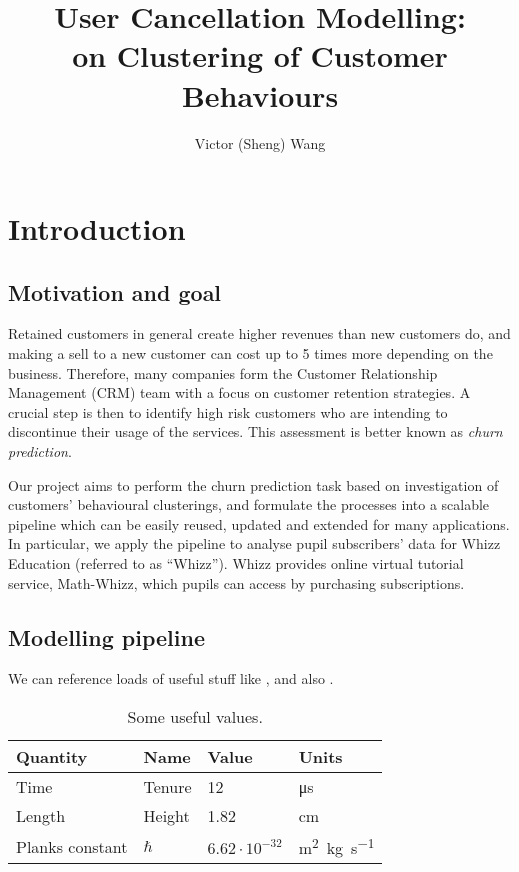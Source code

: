 \documentclass[english,a4,oneside,9pt]{extarticle}
\title{User Cancellation Modelling:
\\on Clustering of Customer Behaviours}
\author{Victor (Sheng) Wang}
\begin{document}




\section{Introduction}
\subsection*{Motivation and goal}

Retained customers in general create higher revenues than new customers do, and
making a sell to a new customer can cost up to 5 times more depending on the business. Therefore, many companies form the Customer Relationship Management (CRM)
team with a focus on customer retention strategies. A crucial step is then to identify
high risk customers who are intending to discontinue their usage of the services. This
assessment is better known as \textit{churn prediction}.


Our project aims to perform the churn prediction task based on investigation
of customers' behavioural clusterings, and formulate the processes into a scalable
pipeline which can be easily reused, updated and extended for many applications.
In particular, we apply the pipeline to analyse pupil subscribers' data for Whizz
Education (referred to as ``Whizz''). Whizz provides online virtual tutorial service,
Math-Whizz, which pupils can access by purchasing subscriptions.

\subsection*{Modelling pipeline}


We can reference loads of useful stuff like , and also .

\begin{table}[htb]
    \centering
    \begin{tabular}{llll}
    	Quantity        & Name      & Value                 & Units                                \\ \hline
    	Time            & Tenure    & 12                    & \si{\micro\second}                   \\
    	Length          & Height    & 1.82                  & \si{\centi\meter}                    \\
    	Planks constant & $ \hbar $ & $ 6.62\cdot10^{-32} $ & \si{\meter^2.\kilogram.\second^{-1}}
    \end{tabular}
    \caption{Some useful values.}
    \label{tab:some_useful_values}
\end{table}
\end{document}
